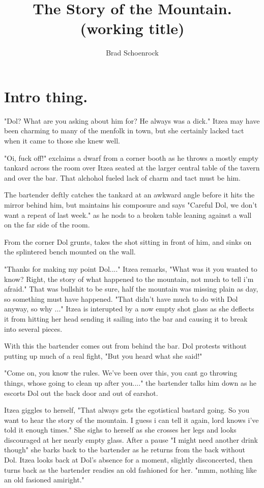 \documentclass[oneside]{book}
\author{Brad Schoenrock}
\title{The Story of the Mountain. (working title)}
\begin{document}
\maketitle

\newpage

\tableofcontents

\newpage

\chapter{Intro thing.}

"Dol? What are you asking about him for? He always was a dick." Itzea may have been charming to many of the menfolk in town, but she certainly lacked tact when it came to those she knew well. 

"Oi, fuck off!" exclaims a dwarf from a corner booth as he throws a mostly empty tankard across the room over Itzea seated at the larger central table of the tavern and over the bar. That alchohol fueled lack of charm and tact must be him. 

The bartender deftly catches the tankard at an awkward angle before it hits the mirror behind him, but maintains his composure and says "Careful Dol, we don't want a repeat of last week." as he nods to a broken table leaning against a wall on the far side of the room.

From the corner Dol grunts, takes the shot sitting in front of him, and sinks on the splintered bench mounted on the wall. 

"Thanks for making my point Dol...." Itzea remarks, "What was it you wanted to know? Right, the story of what happened to the mountain, not much to tell i'm afraid." That was bullshit to be sure, half the mountain was missing plain as day, so something must have happened. "That didn't have much to do with Dol anyway, so why ..." Itzea is interupted by a now empty shot glass as she deflects it from hitting her head sending it sailing into the bar and causing it to break into several pieces. 

With this the bartender comes out from behind the bar. Dol protests without putting up much of a real fight, "But you heard what she said!"

"Come on, you know the rules. We've been over this, you cant go throwing things, whose going to clean up after you...." the bartender talks him down as he escorts Dol out the back door and out of earshot. 

Itzea giggles to herself, "That always gets the egotistical bastard going. So you want to hear the story of the mountain. I guess i can tell it again, lord knows i've told it enough times." She sighs to herself as she crosses her legs and looks discouraged at her nearly empty glass. After a pause "I might need another drink though" she barks back to the bartender as he returns from the back without Dol. Itzea looks back at Dol's absence for a moment, slightly disconcerted, then turns back as the bartender readies an old fashioned for her. "mmm, nothing like an old fasioned amiright." 
\end{document}
